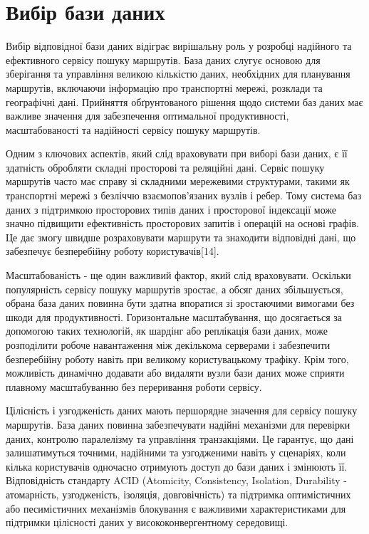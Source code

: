 \section{Вибір бази даних}
\label{sec:frameworks}

Вибір відповідної бази даних відіграє вирішальну роль у розробці надійного та ефективного сервісу пошуку маршрутів. База даних слугує основою для зберігання та управління великою кількістю даних, необхідних для планування маршрутів, включаючи інформацію про транспортні мережі, розклади та географічні дані. Прийняття обґрунтованого рішення щодо системи баз даних має важливе значення для забезпечення оптимальної продуктивності, масштабованості та надійності сервісу пошуку маршрутів.

Одним з ключових аспектів, який слід враховувати при виборі бази даних, є її здатність обробляти складні просторові та реляційні дані. Сервіс пошуку маршрутів часто має справу зі складними мережевими структурами, такими як транспортні мережі з безліччю взаємопов'язаних вузлів і ребер. Тому система баз даних з підтримкою просторових типів даних і просторової індексації може значно підвищити ефективність просторових запитів і операцій на основі графів. Це дає змогу швидше розраховувати маршрути та знаходити відповідні дані, що забезпечує безперебійну роботу користувачів[14].

Масштабованість - ще один важливий фактор, який слід враховувати. Оскільки популярність сервісу пошуку маршрутів зростає, а обсяг даних збільшується, обрана база даних повинна бути здатна впоратися зі зростаючими вимогами без шкоди для продуктивності. Горизонтальне масштабування, що досягається за допомогою таких технологій, як шардінг або реплікація бази даних, може розподілити робоче навантаження між декількома серверами і забезпечити безперебійну роботу навіть при великому користувацькому трафіку. Крім того, можливість динамічно додавати або видаляти вузли бази даних може сприяти плавному масштабуванню без переривання роботи сервісу.

Цілісність і узгодженість даних мають першорядне значення для сервісу пошуку маршрутів. База даних повинна забезпечувати надійні механізми для перевірки даних, контролю паралелізму та управління транзакціями. Це гарантує, що дані залишатимуться точними, надійними та узгодженими навіть у сценаріях, коли кілька користувачів одночасно отримують доступ до бази даних і змінюють її. Відповідність стандарту ACID (Atomicity, Consistency, Isolation, Durability - атомарність, узгодженість, ізоляція, довговічність) та підтримка оптимістичних або песимістичних механізмів блокування є важливими характеристиками для підтримки цілісності даних у висококонвергентному середовищі.

